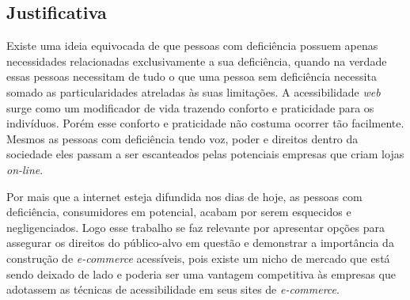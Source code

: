 \subsection{Justificativa}

{


Existe uma ideia equivocada de que pessoas com deficiência possuem apenas necessidades relacionadas exclusivamente a sua deficiência, quando na verdade essas pessoas necessitam de tudo o que uma pessoa sem deficiência necessita somado as particularidades atreladas às suas limitações. A acessibilidade \textit{web} surge como um modificador de vida trazendo conforto e praticidade para os indivíduos. Porém esse conforto e praticidade não costuma ocorrer tão facilmente. Mesmos as pessoas com deficiência tendo voz, poder e direitos dentro da sociedade eles passam a ser escanteados pelas potenciais empresas que criam lojas \textit{on-line}. 

Por mais que a internet esteja difundida nos dias de hoje, as pessoas com deficiência, consumidores em potencial, acabam por serem esquecidos e negligenciados. Logo esse trabalho se faz relevante por apresentar opções para assegurar os direitos do público-alvo em questão e demonstrar a importância da construção de \textit{e-commerce} acessíveis, pois existe um nicho de mercado que está sendo deixado de lado e poderia ser uma vantagem competitiva às empresas que adotassem as técnicas de acessibilidade em seus sites de \textit{e-commerce}.
}
